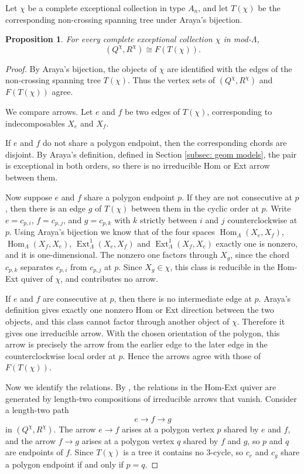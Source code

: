 \documentclass[12pt]{amsart}
\newtheorem{prop}[thm]{Proposition}
\theoremstyle{definition}
\theoremstyle{remark}
\numberwithin{equation}{section}
\DeclareMathOperator{\Hom}{Hom}%
\DeclareMathOperator{\Ext}{Ext}%
\begin{document}
Let \(\chi\) be a complete exceptional collection in type \(A_n\), and let \(T(\chi)\) be the corresponding non-crossing spanning tree under Araya's bijection.

\begin{prop}\label{prop:F-HomExt}
For every complete exceptional collection \(\chi\) in mod-\(\Lambda\),
\[
(Q^\chi,R^\chi) \cong F(T(\chi)).
\]
\end{prop}

\begin{proof}
By Araya's bijection, the objects of \(\chi\) are identified with the edges of the non-crossing spanning tree \(T(\chi)\). Thus the vertex sets of \((Q^\chi,R^\chi)\) and \(F(T(\chi))\) agree.

We compare arrows. Let \(e\) and \(f\) be two edges of \(T(\chi)\), corresponding to indecomposables \(X_e\) and \(X_f\).

If \(e\) and \(f\) do not share a polygon endpoint, then the corresponding chords are disjoint. By Araya's definition, defined in Section \ref{subsec: geom models}, the pair is exceptional in both orders, so there is no irreducible Hom or Ext arrow between them.

Now suppose $e$ and $f$ share a polygon endpoint $p$. If they are not consecutive at $p$, then there is an edge $g$ of $T(\chi)$ between them in the cyclic order at $p$. Write $e = c_{p,i}$, $f = c_{p,j}$, and $g = c_{p,k}$ with $k$ strictly between $i$ and $j$ counterclockwise at $p$. Using Araya's bijection we know that of the four spaces $\Hom_\Lambda(X_e,X_f)$, $\Hom_\Lambda(X_f,X_e)$, $\Ext^1_\Lambda(X_e,X_f)$ and $\Ext^1_\Lambda(X_f,X_e)$ exactly one is nonzero, and it is one-dimensional. The nonzero one factors through $X_g$, since the chord $c_{p,k}$ separates $c_{p,i}$ from $c_{p,j}$ at $p$. Since $X_g \in \chi$, this class is reducible in the Hom-Ext quiver of $\chi$, and contributes no arrow.

If \(e\) and \(f\) are consecutive at \(p\), then there is no intermediate edge at \(p\). Araya's definition gives exactly one nonzero Hom or Ext direction between the two objects, and this class cannot factor through another object of \(\chi\). Therefore it gives one irreducible arrow. With the chosen orientation of the polygon, this arrow is precisely the arrow from the earlier edge to the later edge in the counterclockwise local order at \(p\). Hence the arrows agree with those of \(F(T(\chi))\).

Now we identify the relations. By \cite{igusa2025hom}, the relations in the Hom-Ext quiver are generated by length-two compositions of irreducible arrows that vanish. Consider a length-two path
\[
e \longrightarrow f \longrightarrow g
\]
in $(Q^\chi, R^\chi)$. The arrow $e \to f$ arises at a polygon vertex $p$ shared by $e$ and $f$, and the arrow $f \to g$ arises at a polygon vertex $q$ shared by $f$ and $g$, so $p$ and $q$ are endpoints of $f$. Since $T(\chi)$ is a tree it contains no $3$-cycle, so $c_e$ and $c_g$ share a polygon endpoint if and only if $p = q$.


\end{proof}
\end{document}
